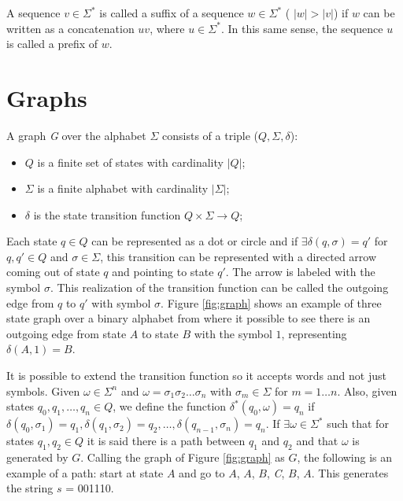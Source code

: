 {A sequence $v \in \Sigma^*$ is called a suffix of a sequence $w \in \Sigma^*$ ( $|\textit{w}| > |\textit{v}|$) if $w$ can be written as a concatenation $uv$, where $u \in \Sigma^*$. In this same sense, the sequence $u$ is called a prefix of $w$. 

\section{Graphs}

\begin{definition}\label{def:graph}
A graph \textit{G} over the alphabet $\Sigma$ consists of a triple ($Q, \Sigma,\delta$):
\begin{itemize}
	\item $Q$ is a finite set of states with cardinality $|Q|$;
    \item $\Sigma$ is a finite alphabet with cardinality $|\Sigma|$;
    \item $\delta$ is the state transition function $Q\times\Sigma \rightarrow Q$;
\end{itemize}
\end{definition}

Each state $q \in Q$ can be represented as a dot or circle and if $\exists \delta(q, \sigma) = q'$ for $q, q' \in Q$ and $\sigma \in \Sigma$, this transition can be represented with a directed arrow coming out of state $q$ and pointing to state $q'$. The arrow is labeled with the symbol $\sigma$. This realization of the transition function can be called the outgoing edge from $q$ to $q'$ with symbol $\sigma$. Figure \ref{fig:graph} shows an example of three state graph over a binary alphabet from where it possible to see there is an outgoing edge from state $A$ to state $B$ with the symbol $1$, representing $\delta(A, 1) = B$.

It is possible to extend the transition function so it accepts words and not just symbols. Given $\omega \in \Sigma^n$ and $\omega = \sigma_1\sigma_2\ldots\sigma_n$ with $\sigma_m \in \Sigma$ for $m = 1\ldots n$. Also, given states $q_0, q_1, \ldots, q_n \in Q$, we define the function $\delta^*(q_0, \omega) = q_n$ if $\delta(q_0, \sigma_1) = q_1, \delta(q_1,\sigma_2) = q_2, \ldots, \delta(q_{n-1},\sigma_n) = q_n$. If $\exists \omega \in \Sigma^*$ such that for states $q_1, q_2 \in Q$ it is said there is a path between $q_1$ and $q_2$ and that $\omega$ is generated by $G$. Calling the graph of Figure \ref{fig:graph} as $G$, the following is an example of a path:  start at state $A$ and go to $A$, $A$, $B$, \textit{C}, $B$, $A$. This generates the string $s$ = 001110.

}
